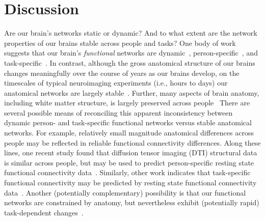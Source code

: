 \message{ !name(main.tex)}\documentclass[11pt]{article}
\begin{document}
{\section*{Discussion}
Are our brain's networks static or dynamic?  And to what extent are
the network properties of our brains stable across people and tasks?
One body of work suggests that our brain's \textit{functional}
networks are dynamic~\citep[e.g., ][]{MannEtal18},
person-specific~\citep[e.g., ][]{FinnEtal15}, and
task-specific~\citep[e.g., ][]{Turk13}.  In contrast, although the
gross anatomical structure of our brains changes meaningfully over the
course of years as our brains develop, on the timescales of typical
neuroimaging experiments (i.e., hours to days) our anatomical networks
are largely stable~\citep[e.g., ][]{CaseEtal00}.  Further, many
aspects of brain anatomy, including white matter structure, is largely
preserved across people~\citep[e.g., ][]{TalaTour88, JahaEtal13,
  MoriEtal08} There are several possible means of reconciling this
apparent inconsistency between dynamic person- and task-specific
functional networks versus stable anatomical networks.  For example,
relatively small magnitude anatomical differences across people may be
reflected in reliable functional connectivity differences.  Along
these lines, one recent study found that diffusion tensor imaging
(DTI) structural data is similar across people, but may be used to
predict person-specific resting state functional connectivity
data~\citep{BeckEtal18}.  Similarly, other work indicates that
task-specific functional connectivity may be predicted by resting
state functional connectivity data~\citep{ColeEtal16, TavoEtal16}.  Another
(potentially complementary) possibility is that our functional
networks are constrained by anatomy, but nevertheless exhibit
(potentially rapid) task-dependent changes~\citep[e.g.,
][]{SporBetz16}.

}
\end{document}
